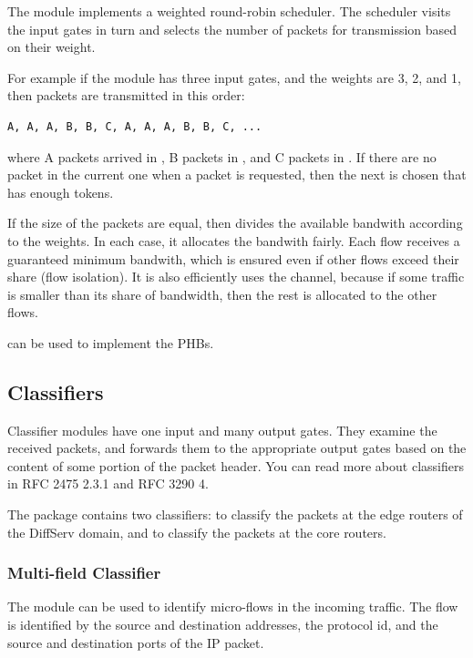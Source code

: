 The  module implements a weighted
round-robin scheduler. The scheduler visits the input gates
in turn and selects the number of packets for transmission
based on their weight.

For example if the module has three input gates, and the weights
are 3, 2, and 1, then packets are transmitted in this order:
\begin{verbatim}
A, A, A, B, B, C, A, A, A, B, B, C, ...
\end{verbatim}
where A packets arrived in , B packets in ,
and C packets in . If there are no packet in the current
one when a packet is requested, then the next is chosen that has
enough tokens.

If the size of the packets are equal, then 
divides the available bandwith according to the weights. In each
case, it allocates the bandwith fairly. Each flow receives a guaranteed
minimum bandwith, which is ensured even if other flows exceed
their share (flow isolation). It is also efficiently uses the
channel, because if some traffic is smaller than its share of
bandwidth, then the rest is allocated to the other flows.

 can be used to implement the  PHBs.

\subsection{Classifiers}

Classifier modules have one input and many output gates.
They examine the received packets, and forwards them to the
appropriate output gates based on the content of some portion
of the packet header. You can read more about classifiers
in RFC 2475 2.3.1 and RFC 3290 4.

The  package contains two
classifiers:  to classify
the packets at the edge routers of the DiffServ domain, and
 to classify the packets
at the core routers.


\subsubsection*{Multi-field Classifier}

The  module can be used to identify
micro-flows in the incoming traffic. The flow is identified
by the source and destination addresses, the protocol id,
and the source and destination ports of the IP packet.

